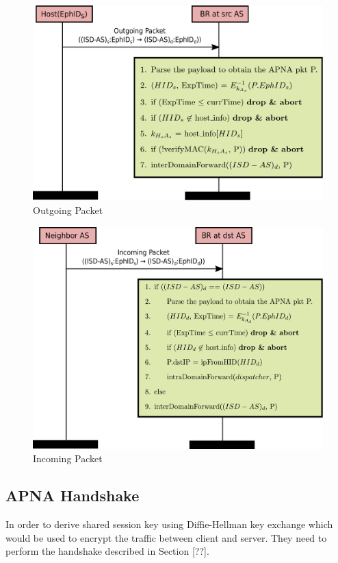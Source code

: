 \begin{figure}[th!!]
\centering
\hspace*{2cm}\includegraphics[scale=0.5]{Figures/overlay_src.pdf}
\decoRule
\caption[Apna Overlay Outgoing Packet]{Outgoing Packet}
\label{fig:overlay_src}
\end{figure}

\begin{figure}[th!!]
\centering
\hspace*{2cm}\includegraphics[scale=0.5]{Figures/overlay_dst.pdf}
\decoRule
\caption[Apna Overlay Incoming Packet]{Incoming Packet}
\label{fig:overlay_dst}
\end{figure}

\subsection{APNA Handshake}
In order to derive shared session key using Diffie-Hellman key exchange which would be used to encrypt the traffic between client and server. They need to perform the handshake described in Section [??]. 

